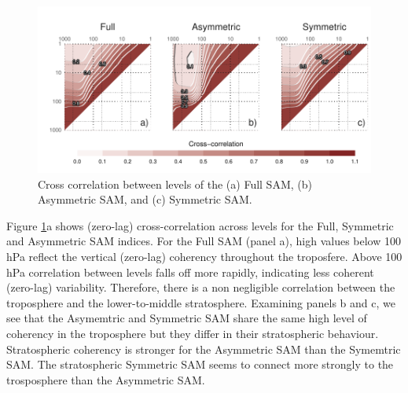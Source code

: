 \documentclass[]{ametsocV5}
\begin{document}
\begin{figure}
\includegraphics{cross-correlation-1} \caption[Cross correlation between levels of the (a) Full SAM, (b) Asymmetric SAM, and (c) Symmetric SAM]{Cross correlation between levels of the (a) Full SAM, (b) Asymmetric SAM, and (c) Symmetric SAM.}\label{fig:cross-correlation}
\end{figure}

Figure \ref{fig:cross-correlation}a shows (zero-lag) cross-correlation
across levels for the Full, Symmetric and Asymmetric SAM indices. For
the Full SAM (panel a), high values below 100 hPa reflect the vertical
(zero-lag) coherency throughout the troposfere. Above 100 hPa
correlation between levels falls off more rapidly, indicating less
coherent (zero-lag) variability. Therefore, there is a non negligible
correlation between the troposphere and the lower-to-middle
stratosphere. Examining panels b and c, we see that the Asymemtric and
Symmetric SAM share the same high level of coherency in the troposphere
but they differ in their stratospheric behaviour. Stratospheric
coherency is stronger for the Asymmetric SAM than the Symemtric SAM. The
stratospheric Symmetric SAM seems to connect more strongly to the
trosposphere than the Asymmetric SAM.
\end{document}

